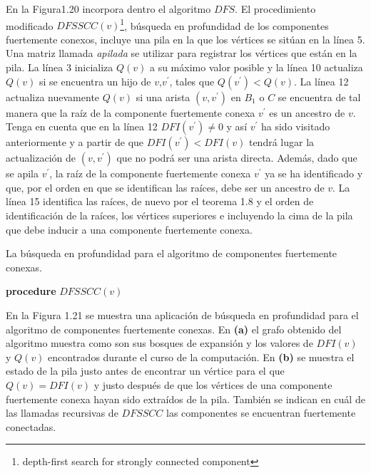 \documentclass[10pt,a5paper]{book}
\begin{document}
En la Figura1.20 incorpora dentro el algoritmo $DFS$. El procedimiento modificado $DFSSCC(v)$\footnote{depth-first search for strongly connected component}, búsqueda en profundidad de los componentes fuertemente conexos, incluye una pila en la que los vértices se sitúan en la línea 5. Una matriz llamada \emph{apilada} se utilizar para registrar los vértices que están en la pila. La línea 3 inicializa $Q(v)$ a su máximo valor posible y la línea 10 actualiza $Q(v)$ si se encuentra un hijo de $v$,$v^{'}$, tales que $Q(v^{'}) < Q(v)$. La línea 12 actualiza nuevamente $Q(v)$ si una arista $(v,v^{'})$ en $B_1$ o $C$ se encuentra de tal manera que la raíz de la componente fuertemente conexa $v^{'}$ es un ancestro de $v$. Tenga en cuenta que en la línea 12 $DFI(v^{'}) \ne 0$ y así $v^{'}$ ha sido visitado anteriormente y a partir de que $DFI(v^{'}) < DFI(v)$ tendrá lugar la actualización de $(v,v^{'})$ que no podrá ser una arista directa. Además, dado que se apila $v^{'}$, la raíz de la componente fuertemente conexa $v^{'}$ ya se ha identificado y que, por el orden en que se identifican las raíces, debe ser un ancestro de $v$. La línea 15 identifica las raíces, de nuevo por el teorema 1.8 y el orden de identificación de la raíces, los vértices superiores e incluyendo la cima de la pila que debe inducir a una componente fuertemente conexa.
\begin{algorithm}[H]
\caption{La búsqueda en profundidad para el algoritmo de componentes fuertemente conexas.}
\BlankLine
\dontprintsemicolon
\textbf{procedure} $DFSSCC(v)$
\end{algorithm}
En la Figura 1.21 se muestra una aplicación de búsqueda en profundidad para el algoritmo de componentes fuertemente conexas. En \textbf{(a)} el grafo obtenido del algoritmo muestra como son sus bosques de expansión y los valores de $DFI(v)$ y $Q(v)$ encontrados durante el curso de la computación. En \textbf{(b)} se muestra el estado de la pila justo antes de encontrar un vértice para el que $Q(v) = DFI(v)$ y justo después de que los vértices de una componente fuertemente conexa hayan sido extraídos de la pila. También se indican en cuál de las llamadas recursivas de $DFSSCC$ las componentes se encuentran fuertemente conectadas.
\end{document}
